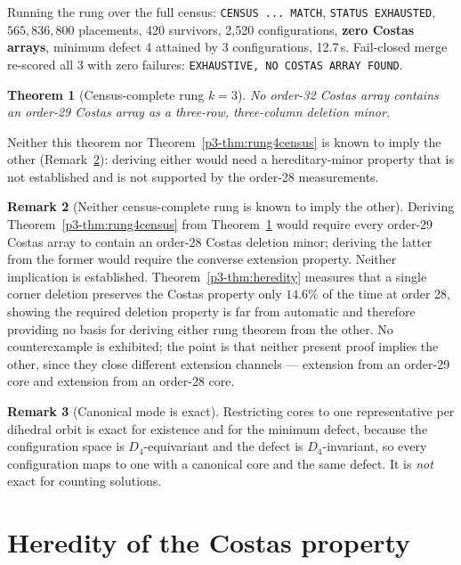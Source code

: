 \documentclass[11pt,a4paper,oneside]{report}
\newtheorem{theorem}{Theorem}[chapter]
\theoremstyle{definition}
\newtheorem{remark}[theorem]{Remark}
\begin{document}
Running the rung over the full census: \texttt{CENSUS ... MATCH}, \texttt{STATUS
EXHAUSTED}, $565{,}836{,}800$ placements, 420 survivors, 2{,}520 configurations,
\textbf{zero Costas arrays}, minimum defect 4 attained by 3 configurations,
12.7\,s. Fail-closed merge re-scored all 3 with zero failures:
\texttt{EXHAUSTIVE, NO COSTAS ARRAY FOUND}.

\begin{theorem}[Census-complete rung $k=3$]
\label{p3-thm:rung3census}
No order-32 Costas array contains an order-29 Costas array as a three-row,
three-column deletion minor.
\end{theorem}


Neither this theorem nor Theorem~\ref{p3-thm:rung4census} is known to imply the other
(Remark~\ref{p3-rem:independent}): deriving either would need a hereditary-minor property that is not established and is not supported by the
order-28 measurements.

\begin{remark}[Neither census-complete rung is known to imply the other]
\label{p3-rem:independent}
Deriving Theorem~\ref{p3-thm:rung4census} from Theorem~\ref{p3-thm:rung3census} would require every order-29
Costas array to contain an order-28 Costas deletion minor; deriving the latter from
the former would require the converse extension property. Neither implication is
established. Theorem~\ref{p3-thm:heredity} measures that a single corner deletion
preserves the Costas property only $14.6\%$ of the time at order 28, showing the
required deletion property is far from automatic and therefore providing no basis
for deriving either rung theorem from the other. No counterexample is exhibited;
the point is that neither present proof implies the other, since they close different extension channels --- extension from an order-29 core and extension from an
order-28 core.
\end{remark}


\begin{remark}[Canonical mode is exact]
Restricting cores to one representative per dihedral orbit is exact for
existence and for the minimum defect, because the configuration space is
$D_4$-equivariant and the defect is $D_4$-invariant, so every configuration maps
to one with a canonical core and the same defect. It is \emph{not} exact for
counting solutions.
\end{remark}

\section{Heredity of the Costas property}
\label{p3-sec:heredity}
\end{document}
